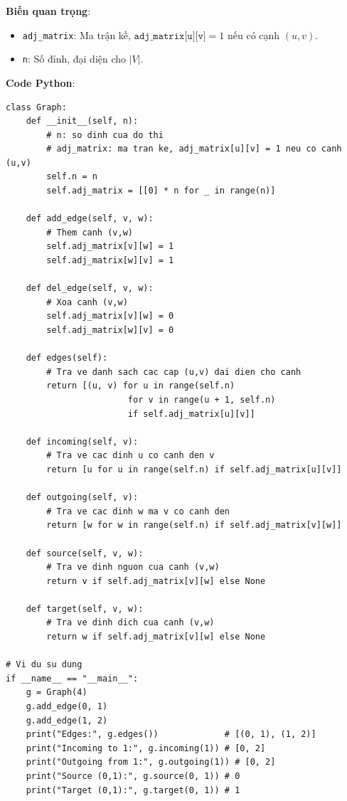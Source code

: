 \documentclass[a4paper,12pt]{article}
\begin{document}
\textbf{Biến quan trọng}:
\begin{itemize}
    \item \texttt{adj\_matrix}: Ma trận kề, \( \texttt{adj\_matrix[u][v]} = 1\) nếu có cạnh \((u,v)\).
    \item \texttt{n}: Số đỉnh, đại diện cho \(|V|\).
\end{itemize}

\textbf{Code Python}:
\lstset{language=Python}
\begin{lstlisting}
class Graph:
    def __init__(self, n):
        # n: so dinh cua do thi
        # adj_matrix: ma tran ke, adj_matrix[u][v] = 1 neu co canh (u,v)
        self.n = n
        self.adj_matrix = [[0] * n for _ in range(n)]

    def add_edge(self, v, w):
        # Them canh (v,w)
        self.adj_matrix[v][w] = 1
        self.adj_matrix[w][v] = 1

    def del_edge(self, v, w):
        # Xoa canh (v,w)
        self.adj_matrix[v][w] = 0
        self.adj_matrix[w][v] = 0

    def edges(self):
        # Tra ve danh sach cac cap (u,v) dai dien cho canh
        return [(u, v) for u in range(self.n)
                        for v in range(u + 1, self.n)
                        if self.adj_matrix[u][v]]

    def incoming(self, v):
        # Tra ve cac dinh u co canh den v
        return [u for u in range(self.n) if self.adj_matrix[u][v]]

    def outgoing(self, v):
        # Tra ve cac dinh w ma v co canh den
        return [w for w in range(self.n) if self.adj_matrix[v][w]]

    def source(self, v, w):
        # Tra ve dinh nguon cua canh (v,w)
        return v if self.adj_matrix[v][w] else None

    def target(self, v, w):
        # Tra ve dinh dich cua canh (v,w)
        return w if self.adj_matrix[v][w] else None

# Vi du su dung
if __name__ == "__main__":
    g = Graph(4)
    g.add_edge(0, 1)
    g.add_edge(1, 2)
    print("Edges:", g.edges())             # [(0, 1), (1, 2)]
    print("Incoming to 1:", g.incoming(1)) # [0, 2]
    print("Outgoing from 1:", g.outgoing(1)) # [0, 2]
    print("Source (0,1):", g.source(0, 1)) # 0
    print("Target (0,1):", g.target(0, 1)) # 1
\end{lstlisting}
\end{document}
